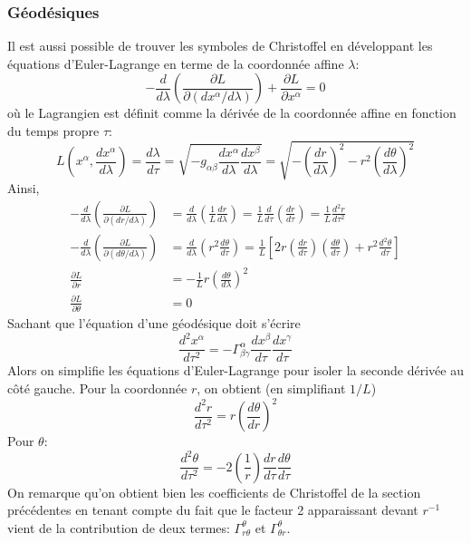 \documentclass{article}
\numberwithin{equation}{section}
\begin{document}
\subsubsection{Géodésiques}
Il est aussi possible de trouver les symboles de Christoffel en développant les équations d'Euler-Lagrange 
en terme de la coordonnée affine $\lambda$:
\[
        -\frac{d}{d\lambda} \left( \frac{\partial L}{\partial (dx^{\alpha} / d\lambda)} \right) 
        + \frac{\partial L}{\partial x^{\alpha}} = 0
\]
où le Lagrangien est définit comme la dérivée de la coordonnée affine en fonction du temps propre 
$\tau$:
\[
        L \left( x^{\alpha}, \frac{d x^{\alpha}}{d \lambda}  \right) = 
        \frac{d \lambda}{d \tau} =  
        \sqrt{ - g_{\alpha \beta } \frac{d x^{\alpha}}{d \lambda} \frac{d x^{\beta}}{d \lambda}  }
        = \sqrt{-\left( \frac{d r}{d \lambda}  \right)^{2} 
        - r^2 \left( \frac{d \theta}{d \lambda}  \right)^{2}}
\]
Ainsi,
\begin{align*}
        -\frac{d}{d\lambda} \left( \frac{\partial L}{\partial (dr / d\lambda)} \right)
        &= \frac{d}{d\lambda}\left( \frac{1}{L}\frac{d r}{d \lambda}  \right)  
        = \frac{1}{L}\frac{d }{d \tau} \left( \frac{d r}{d \tau}  \right) 
        = \frac{1}{L} \frac{d^{2}r}{d \tau^2} 
        \\
        -\frac{d}{d\lambda} \left( \frac{\partial L}{\partial (d\theta / d\lambda)} \right) 
        &= \frac{d }{d \lambda} \left( r^2\frac{d \theta}{d \tau}  \right)
        = \frac{1}{L} \left[ 2r  \left( \frac{d r}{d \tau}  \right)\left( \frac{d\theta}{d\tau} \right) 
        + r^2 \frac{d^{2}\theta}{d \tau}  \right]
        \\
        \frac{\partial L}{\partial r} 
        &= -\frac{1}{L} r\left( \frac{d \theta}{d \lambda} \right)^{2}
        \\
        \frac{\partial L}{\partial \theta} &=  0
\end{align*}
Sachant que l'équation d'une géodésique doit s'écrire
\[
        \frac{d^{2} x^{\alpha}}{d\tau^2} = -\Gamma^{\alpha}_{\beta \gamma} \frac{d x^{\beta}}{d \tau} \frac{d x^{\gamma}}{d \tau}  
\]
Alors on simplifie les équations d'Euler-Lagrange pour isoler la seconde dérivée au côté 
gauche. Pour la coordonnée $r$, on obtient (en simplifiant $1/L$)
\[
        \boxed{\frac{d^{2}r}{d \tau^{2}} = r\left( \frac{d\theta}{dr} \right)^{2}}
\]
Pour $\theta$:
\[
        \boxed{\frac{d^{2} \theta}{d \tau^{2}}  = -2 \left( \frac{1}{r} \right)\frac{d r}{d \tau} \frac{d \theta}{d \tau}  }
\]
On remarque qu'on obtient bien les coefficients de Christoffel de la section précédentes en tenant 
compte du fait que le facteur 2 apparaissant devant $r^{-1}$ vient de la contribution de deux termes:
$\Gamma^{\theta}_{r\theta}$ 
et $\Gamma^{\theta}_{\theta r}$.
\end{document}
